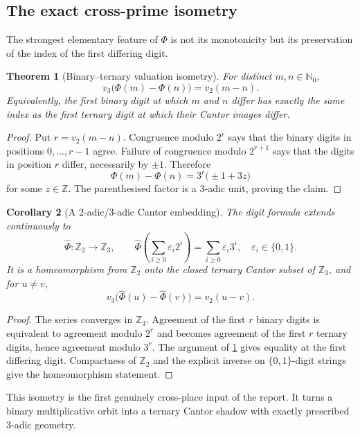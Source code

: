 \documentclass[11pt]{article}
\newtheorem{theorem}{Theorem}[section]
\newtheorem{corollary}[theorem]{Corollary}
\theoremstyle{definition}
\theoremstyle{remark}
\newcommand{\Nzero}{\mathbb N_0}
\newcommand{\Z}{\mathbb Z}
\newcommand{\vTwo}{v_2}
\newcommand{\vThree}{v_3}
\newcommand{\PhiMap}{\Phi}
\begin{document}
\subsection{The exact cross-prime isometry}

The strongest elementary feature of $\PhiMap$ is not its monotonicity but its
preservation of the index of the first differing digit.

\begin{theorem}[Binary--ternary valuation isometry]\label{thm:isometry}
For distinct $m,n\in\Nzero$,
\[
  \boxed{\quad
  \vThree\bigl(\PhiMap(m)-\PhiMap(n)\bigr)
  =\vTwo(m-n).
  \quad}
\]
Equivalently, the first binary digit at which $m$ and $n$ differ has exactly
the same index as the first ternary digit at which their Cantor images differ.
\end{theorem}

\begin{proof}
Put $r=\vTwo(m-n)$.  Congruence modulo $2^r$ says that the binary digits in
positions $0,\ldots,r-1$ agree.  Failure of congruence modulo $2^{r+1}$ says
that the digits in position $r$ differ, necessarily by $\pm1$.  Therefore
\[
 \PhiMap(m)-\PhiMap(n)
 =3^r\bigl(\pm1+3z\bigr)
\]
for some $z\in\Z$.  The parenthesised factor is a $3$-adic unit, proving the
claim.
\end{proof}

\begin{corollary}[A $2$-adic/$3$-adic Cantor embedding]\label{cor:padic-extension}
The digit formula extends continuously to
\[
  \widehat\Phi:\Z_2\longrightarrow\Z_3,
  \qquad
  \widehat\Phi\!\left(\sum_{i\ge0}\varepsilon_i2^i\right)
  =\sum_{i\ge0}\varepsilon_i3^i,
  \quad \varepsilon_i\in\{0,1\}.
\]
It is a homeomorphism from $\Z_2$ onto the closed ternary Cantor subset of
$\Z_3$, and for $u\ne v$,
\[
  \vThree\bigl(\widehat\Phi(u)-\widehat\Phi(v)\bigr)=\vTwo(u-v).
\]
\end{corollary}

\begin{proof}
The series converges in $\Z_3$.  Agreement of the first $r$ binary digits is
equivalent to agreement modulo $2^r$ and becomes agreement of the first $r$
ternary digits, hence agreement modulo $3^r$.  The argument of
\cref{thm:isometry} gives equality at the first differing digit.  Compactness
of $\Z_2$ and the explicit inverse on $\{0,1\}$-digit strings give the
homeomorphism statement.
\end{proof}

This isometry is the first genuinely cross-place input of the report.  It
turns a binary multiplicative orbit into a ternary Cantor shadow with exactly
prescribed $3$-adic geometry.
\end{document}
